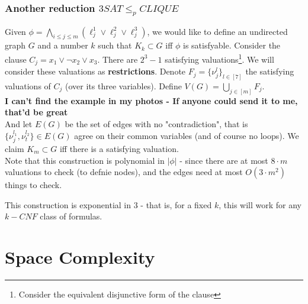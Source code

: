 \subsection*{Another reduction $3SAT\leq_p CLIQUE$}
Given $\phi = {\displaystyle \bigwedge_{i\leq j\leq m}}\left(\ell^1_j \lor \ell^2_j \lor \ell^3_j\right)$, we would like to define an undirected graph $G$ and a number $k$ such that $K_k\subset G$ iff $\phi$ is satisfyable. Consider the clause $C_j = x_1\lor \neg x_2 \lor x_3$. There are $2^3-1$ satisfying valuations\footnote{Consider the equivalent disjunctive form of the clause}. We will consider these valuations as \textbf{restrictions}. Denote $F_j = \{\nu^l_j\}_{l\in [7]}$ the satisfying valuations of $C_j$ (over its three variables). Define $V(G) = {\displaystyle \bigcup_{j\in [m]} F_j}$.\\
\textbf{I can't find the example in my photos - If anyone could send it to me, that'd be great }\\
And let $E(G)$ be the set of edges with no "contradiction", that is $\{\nu^{l_1}_j,\nu^{l_2}_t\}\in E(G)$ agree on their common variables (and of course no loops). We claim $K_m\subset G$ iff there is a satisfying valuation.\\
Note that this construction is polynomial in $|\phi|$ - since there are at most $8\cdot m$ valuations to check (to defnie nodes), and the edges need at most $O(3\cdot m^2)$ things to check.
\begin{remark}
	This construction is exponential in $3$ - that is, for a fixed $k$, this will work for any $k-CNF$ class of formulas.
\end{remark}
\chapter{Space Complexity}

